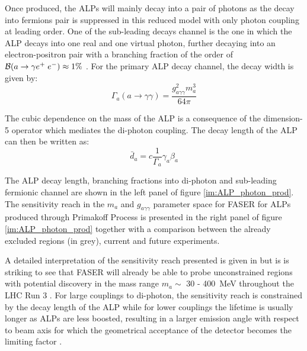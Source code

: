 		Once produced, the ALPs will mainly decay into a pair of photons as the decay into fermions pair is suppressed in this reduced model with only photon coupling at leading order. One of the sub-leading decays channel is the one in which the ALP decays into one real and one virtual photon, further decaying into an electron-positron pair with a branching fraction of the order of $\mathcal{B}(a \rightarrow \gamma e^+ \hspace{1mm} e^-) \approx 1 \%$ \cite{FASER_LLP}. For the primary ALP decay channel, the decay width is given by: 
		\begin{equation}
			\Gamma_a(a\rightarrow \gamma \gamma) = \frac{g_{a \gamma\gamma}^2 m_a^3}{64 \pi}
		\end{equation}
		
		The cubic dependence on the mass of the ALP is a consequence of the dimension-5 operator which mediates the di-photon coupling. The decay length of the ALP can then be written as: 
		\begin{equation}
			\bar{d}_a = c \frac{1}{\Gamma_{a}} \gamma_{a} \beta_{a} 
			\label{eq:ALP_decay_length}
		\end{equation}
		
		The ALP decay length, branching fractions into di-photon and sub-leading fermionic channel are shown in the left panel of figure \ref{im:ALP_photon_prod}. The sensitivity reach in the $m_{a}$ and $g_{a\gamma\gamma}$ parameter space for FASER for ALPs produced through Primakoff Process is presented in the right panel of figure \ref{im:ALP_photon_prod} together with a comparison between the already excluded regions (in grey), current and future experiments.
		
		A detailed interpretation of the sensitivity reach presented is given in \cite{FASER_LLP} but is is striking to see that FASER will already be able to probe unconstrained regions with potential discovery in the mass range $m_a  \sim $ 30 - \SI{400}{\mega\electronvolt} throughout the LHC Run 3 \cite{Primakoff_process}. For large couplings to di-photon, the sensitivity reach is constrained by the decay length of the ALP while for lower couplings the lifetime is usually longer as ALPs are less boosted, resulting in a larger emission angle with respect to beam axis for which the geometrical acceptance of the detector becomes the limiting factor \cite{Primakoff_process}. 
		\clearpage	
		
